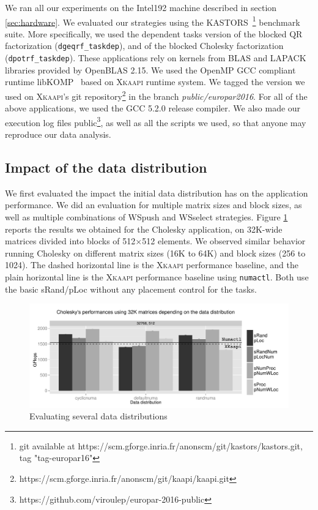 \documentclass{Styles/llncs}
\newcommand{\kaapi}{\textsc{\mbox{Xkaapi}}\xspace}
\begin{document}
We ran all our experiments on the Intel192 machine described in section \ref{sec:hardware}.
We evaluated our strategies using the KASTORS~\cite{virouleau:hal-01081974}\footnote{git available at https://scm.gforge.inria.fr/anonscm/git/kastors/kastors.git, tag "tag-europar16"} benchmark suite.
More specifically, we used the dependent tasks version of the blocked QR factorization
(\verb/dgeqrf_taskdep/), and of the blocked Cholesky factorization (\verb/dpotrf_taskdep/).
These applications rely on kernels from BLAS and LAPACK libraries provided by OpenBLAS 2.15.
We used the OpenMP GCC compliant runtime libKOMP~\cite{libkomp} based on \kaapi runtime system. We tagged the version we used on \kaapi's
git repository\footnote{https://scm.gforge.inria.fr/anonscm/git/kaapi/kaapi.git } in the branch \emph{public/europar2016}.
For all of the above applications, we used the GCC 5.2.0 release compiler.
We also made our execution log files public\footnote{https://github.com/viroulep/europar-2016-public}, as well as all the scripts we used, so that
anyone may reproduce our data analysis.

\subsection{Impact of the data distribution}

We first evaluated the impact the initial data distribution has on the application performance. We did an evaluation for multiple matrix sizes and block sizes,
as well as multiple combinations of WSpush and WSselect strategies. Figure \ref{fig:eval-distrib} reports the
results we obtained for the Cholesky application, on 32K-wide matrices divided into blocks of 512$\times$512 elements. We observed similar behavior running Cholesky on different matrix sizes (16K to 64K) and block sizes (256 to 1024).
The dashed horizontal line is the \kaapi performance baseline, and the plain
horizontal line is the \kaapi performance baseline using \verb/numactl/. Both use the basic sRand/pLoc without any placement control for the tasks.

\begin{figure}[t]
  \centering
  \includegraphics[scale=0.5]{figures/graph_distrib.pdf}
\caption{Evaluating several data distributions}
\label{fig:eval-distrib}
\end{figure}
\end{document}
